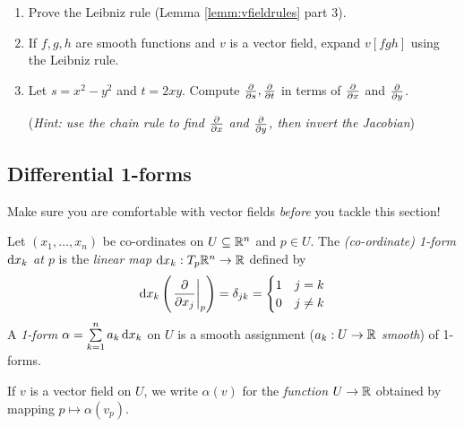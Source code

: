 \begin{exercises}
\begin{enumerate}
  \item Prove the Leibniz rule (Lemma \ref{lemm:vfieldrules} part 3).
  
 	\item If $f,g,h$ are smooth functions and $v$ is a vector field, expand $v[fgh]$ using the Leibniz rule.
  
  \item Let $s=x^2-y^2$ and $t=2xy$. Compute $\frac{\partial }{\partial s},\frac{\partial }{\partial t}$ in terms of $\frac{\partial }{\partial x}$ and $\frac{\partial }{\partial y}$.\par
  (\emph{Hint: use the chain rule to find $\frac{\partial }{\partial x}$ and $\frac{\partial }{\partial y}$, then invert the Jacobian})
  

\end{enumerate}
\end{exercises}

\clearpage

\subsection{Differential 1-forms}\label{sec:1form}

Make sure you are comfortable with vector fields \emph{before} you tackle this section!

\begin{defn}{}{}
Let $(x_1,\ldots,x_n)$ be co-ordinates on $U\subseteq\mathbb{R}^n$ and $p\in U$. The \emph{(co-ordinate) 1-form ${\mathrm{d} x}_k$ at $p$} is the \emph{linear map\footnotemark} ${\mathrm{d} x}_k:T_p\mathbb{R}^n\to\mathbb{R}$ defined by
\[{\mathrm{d} x}_k\left(\left.\frac{\partial }{\partial x_j}\right|_{p}\right)=\delta_{jk}=
\begin{cases}
1&j=k\\
0&j\neq k
\end{cases}\]
A \emph{1-form} $\alpha=\sum\limits_{k=1}^n a_k\,{\mathrm{d} x}_k$ on $U$ is a smooth assignment ($a_k:U\to\mathbb{R}$ \emph{smooth}) of 1-forms.\par
If $v$ is a vector field on $U$, we write $\alpha(v)$ for the \emph{function} $U\to\mathbb{R}$ obtained by mapping $p\mapsto\alpha(v_p)$.
\end{defn}



